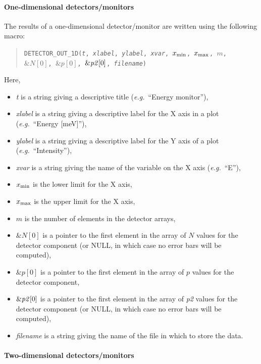 {\paragraph{One-dimensional detectors/monitors}

The results of a one-dimensional detector/\discretionary{}{}{}mon\-i\-tor are written using the
following macro:
\begin{quote}
  \texttt{DETECTOR\_OUT\_1D({\it t},
        {\it xlabel},
        {\it ylabel},
        {\it xvar}, $x_{\rm min}$, $x_{\rm max}$, $m$, \\
          $\&N[0]$, $\&p[0]$, $\&{\it p2}[0]$,
        {\it filename})}
\end{quote}
Here,
\begin{itemize}
\item \textit{t} is a string giving a descriptive title ({\em e.g.}\ ``Energy
  monitor''),
\item \textit{xlabel} is a string giving a descriptive label for the X
  axis in a plot ({\em e.g.}\ ``Energy [meV]''),
\item \textit{ylabel} is a string giving a descriptive label for the Y
  axis of a plot ({\em e.g.}\ ``Intensity''),
\item \textit{xvar} is a string giving the name of the variable on the X
  axis ({\em e.g.}\ ``E''),
\item $x_{\rm min}$ is the lower limit for the X axis,
\item $x_{\rm max}$ is the upper limit for the X axis,
\item $m$ is the number of elements in the detector arrays,
\item $\&N[0]$ is a pointer to the first element in the array of $N$
  values for the detector component (or NULL, in which case no error
  bars will be computed),
\item $\&p[0]$ is a pointer to the first element in the array of $p$
  values for the detector component,
\item $\&{\it p2}[0]$ is a pointer to the first element in the array of
  {\it p2} values for the detector component (or NULL, in which case no error
  bars will be computed),
\item \textit{filename} is a string giving the name of the file in which
  to store the data.
\end{itemize}


\paragraph{Two-dimensional detectors/monitors}

}
